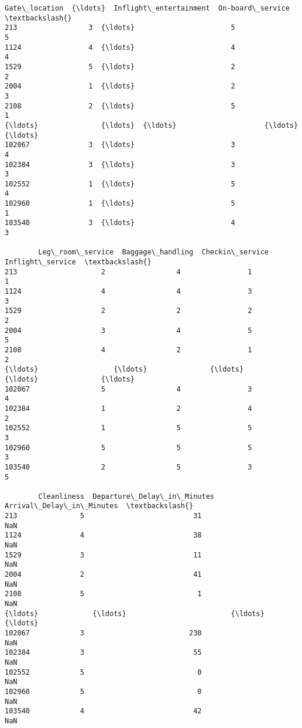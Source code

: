 \documentclass[11pt]{article}
\begin{document}
\begin{tcolorbox}[breakable, size=fbox, boxrule=.5pt, pad at break*=1mm, opacityfill=0]
\begin{Verbatim}[commandchars=\\\{\}]
        Gate\_location  {\ldots}  Inflight\_entertainment  On-board\_service  \textbackslash{}
213                 3  {\ldots}                       5                 5
1124                4  {\ldots}                       4                 4
1529                5  {\ldots}                       2                 2
2004                1  {\ldots}                       2                 3
2108                2  {\ldots}                       5                 1
{\ldots}               {\ldots}  {\ldots}                     {\ldots}               {\ldots}
102067              3  {\ldots}                       3                 4
102384              3  {\ldots}                       3                 3
102552              1  {\ldots}                       5                 4
102960              1  {\ldots}                       5                 1
103540              3  {\ldots}                       4                 3

        Leg\_room\_service  Baggage\_handling  Checkin\_service  Inflight\_service  \textbackslash{}
213                    2                 4                1                 1
1124                   4                 4                3                 3
1529                   2                 2                2                 2
2004                   3                 4                5                 5
2108                   4                 2                1                 2
{\ldots}                  {\ldots}               {\ldots}              {\ldots}               {\ldots}
102067                 5                 4                3                 4
102384                 1                 2                4                 2
102552                 1                 5                5                 3
102960                 5                 5                5                 3
103540                 2                 5                3                 5

        Cleanliness  Departure\_Delay\_in\_Minutes  Arrival\_Delay\_in\_Minutes  \textbackslash{}
213               5                          31                       NaN
1124              4                          38                       NaN
1529              3                          11                       NaN
2004              2                          41                       NaN
2108              5                           1                       NaN
{\ldots}             {\ldots}                         {\ldots}                       {\ldots}
102067            3                         230                       NaN
102384            3                          55                       NaN
102552            5                           0                       NaN
102960            5                           0                       NaN
103540            4                          42                       NaN


\end{Verbatim}
\end{tcolorbox}
\end{document}
